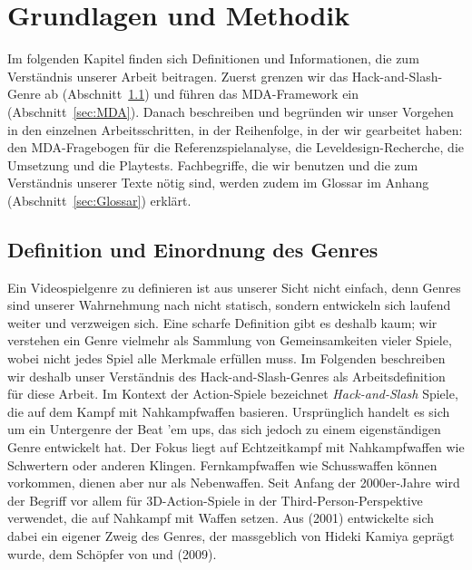 \documentclass[../Main.tex]{subfiles}
\begin{document}
\section{Grundlagen und Methodik} \label{sec:Grundlagen}
Im folgenden Kapitel finden sich Definitionen und Informationen, die zum Verständnis unserer Arbeit beitragen. Zuerst grenzen wir das Hack-and-Slash-Genre ab (Abschnitt~\ref{sec:Genredefinition}) und führen das MDA-Framework ein (Abschnitt~\ref{sec:MDA}). Danach beschreiben und begründen wir unser Vorgehen in den einzelnen Arbeitsschritten, in der Reihenfolge, in der wir gearbeitet haben: den MDA-Fragebogen für die Referenzspielanalyse, die Leveldesign-Recherche, die Umsetzung und die Playtests. Fachbegriffe, die wir benutzen und die zum Verständnis unserer Texte nötig sind, werden zudem im Glossar im Anhang (Abschnitt~\ref{sec:Glossar}) erklärt.

\subsection{Definition und Einordnung des Genres} \label{sec:Genredefinition}
Ein Videospielgenre zu definieren ist aus unserer Sicht nicht einfach, denn Genres sind unserer Wahrnehmung nach nicht statisch, sondern entwickeln sich laufend weiter und verzweigen sich. Eine scharfe Definition gibt es deshalb kaum; wir verstehen ein Genre vielmehr als Sammlung von Gemeinsamkeiten vieler Spiele, wobei nicht jedes Spiel alle Merkmale erfüllen muss. Im Folgenden beschreiben wir deshalb unser Verständnis des Hack-and-Slash-Genres als Arbeitsdefinition für diese Arbeit. Im Kontext der Action-Spiele bezeichnet \textit{Hack-and-Slash} Spiele, die auf dem Kampf mit Nahkampfwaffen basieren. Ursprünglich handelt es sich um ein Untergenre der Beat 'em ups, das sich jedoch zu einem eigenständigen Genre entwickelt hat.\autocite{wikipedia_hackandslash} Der Fokus liegt auf Echtzeitkampf mit Nahkampfwaffen wie Schwertern oder anderen Klingen. Fernkampfwaffen wie Schusswaffen können vorkommen, dienen aber nur als Nebenwaffen.\autocite{wikipedia_hackandslash} Seit Anfang der 2000er-Jahre wird der Begriff vor allem für 3D-Action-Spiele in der Third-Person-Perspektive verwendet, die auf Nahkampf mit Waffen setzen.\autocite{wikipedia_hackandslash} Aus  (2001)\autocite{capcom_devilmaycry_2001} entwickelte sich dabei ein eigener Zweig des Genres, der massgeblich von Hideki Kamiya geprägt wurde, dem Schöpfer von  und  (2009)\autocite{platinumgames_bayonetta_2009}.\autocite{wikipedia_hackandslash}
\end{document}
